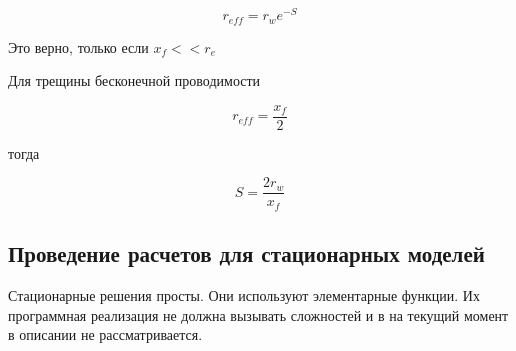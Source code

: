 \begin{equation}
	r_{eff} = r_w e^{-S}
\end{equation}

Это верно, только если $x_f << r_e$

Для трещины бесконечной проводимости 

\begin{equation}
	r_{eff} = \frac{x_f}{2}
\end{equation}

тогда 

\begin{equation}
	S = \frac{2r_w}{x_f}
\end{equation}




\subsection{Проведение расчетов для стационарных моделей} 
Стационарные решения просты. Они используют элементарные функции. Их программная реализация не должна вызывать сложностей и в на текущий момент в описании не рассматривается.

